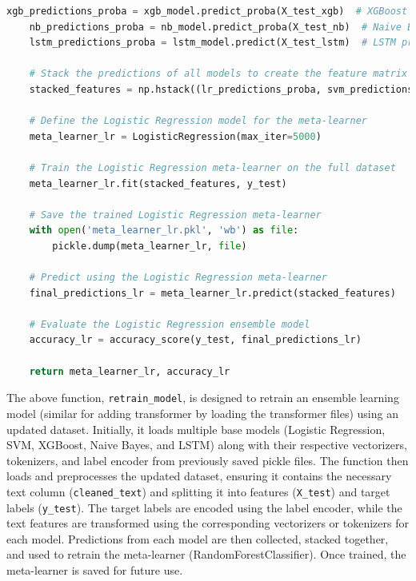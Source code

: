 \begin{tcolorbox}[colback=gray!5!white, colframe=gray!80!black, boxrule=0.5pt, title=Retraining the Ensemble Model]
    \begin{lstlisting}[language=Python]
    xgb_predictions_proba = xgb_model.predict_proba(X_test_xgb)  # XGBoost probabilities
    nb_predictions_proba = nb_model.predict_proba(X_test_nb)  # Naive Bayes probabilities
    lstm_predictions_proba = lstm_model.predict(X_test_lstm)  # LSTM probabilities

    # Stack the predictions of all models to create the feature matrix for the meta-learner
    stacked_features = np.hstack((lr_predictions_proba, svm_predictions_proba, xgb_predictions_proba, nb_predictions_proba, lstm_predictions_proba))

    # Define the Logistic Regression model for the meta-learner
    meta_learner_lr = LogisticRegression(max_iter=5000)
    
    # Train the Logistic Regression meta-learner on the full dataset
    meta_learner_lr.fit(stacked_features, y_test)
    
    # Save the trained Logistic Regression meta-learner
    with open('meta_learner_lr.pkl', 'wb') as file:
        pickle.dump(meta_learner_lr, file)
    
    # Predict using the Logistic Regression meta-learner
    final_predictions_lr = meta_learner_lr.predict(stacked_features)
    
    # Evaluate the Logistic Regression ensemble model
    accuracy_lr = accuracy_score(y_test, final_predictions_lr)

    return meta_learner_lr, accuracy_lr
\end{lstlisting}
\end{tcolorbox}

\noindent
The above function, \texttt{retrain\_model}, is designed to retrain an ensemble learning model (similar for adding transformer by loading the transformer files) using an updated dataset. Initially, it loads multiple base models (Logistic Regression, SVM, XGBoost, Naive Bayes, and LSTM) along with their respective vectorizers, tokenizers, and label encoder from previously saved pickle files. The function then loads and preprocesses the updated dataset, ensuring it contains the necessary text column (\texttt{cleaned\_text}) and splitting it into features (\texttt{X\_test}) and target labels (\texttt{y\_test}). The target labels are encoded using the label encoder, while the text features are transformed using the corresponding vectorizers or tokenizers for each model. Predictions from each model are then collected, stacked together, and used to retrain the meta-learner (RandomForestClassifier). Once trained, the meta-learner is saved for future use.

